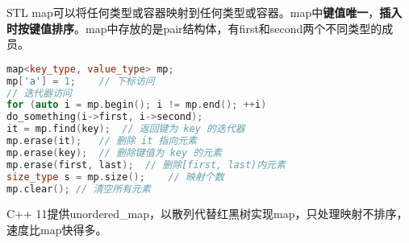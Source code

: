 STL map可以将任何类型或容器映射到任何类型或容器。map中\textbf{键值唯一}，\textbf{插入时按键值排序}。map中存放的是pair结构体，有first和second两个不同类型的成员。



\begin{lstlisting}[language=c++]
map<key_type, value_type> mp;
mp['a'] = 1;	// 下标访问
// 迭代器访问
for (auto i = mp.begin(); i != mp.end(); ++i)
do_something(i->first, i->second);
it = mp.find(key);	// 返回键为 key 的迭代器
mp.erase(it);	// 删除 it 指向元素
mp.erase(key);	// 删除键值为 key 的元素
mp.erase(first, last);	// 删除[first, last)内元素
size_type s = mp.size();	// 映射个数
mp.clear();	// 清空所有元素
\end{lstlisting}

C++ 11提供unordered\_map，以散列代替红黑树实现map，只处理映射不排序，速度比map快得多。
